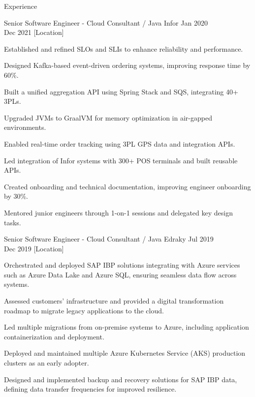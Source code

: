 \documentclass{resume} %
\begin{document}
\begin{rSection}{Experience}
    \begin{rSubsection}
        {Senior Software Engineer - Cloud Consultant / Java}
        {Infor}
        {Jan 2020 \\ Dec 2021}
        [Location]
        \begin{rItemize}
            \item Established and refined SLOs and SLIs to enhance reliability and performance.
            \item Designed Kafka-based event-driven ordering systems, improving response time by 60\%.
            \item Built a unified aggregation API using Spring Stack and SQS, integrating 40+ 3PLs.
            \item Upgraded JVMs to GraalVM for memory optimization in air-gapped environments.
            \item Enabled real-time order tracking using 3PL GPS data and integration APIs.
            \item Led integration of Infor systems with 300+ POS terminals and built reusable APIs.
            \item Created onboarding and technical documentation, improving engineer onboarding by 30\%.
            \item Mentored junior engineers through 1-on-1 sessions and delegated key design tasks.
        \end{rItemize}
    \end{rSubsection}

    \begin{rSubsection}
        {Senior Software Engineer - Cloud Consultant / Java}
        {Edraky}
        {Jul 2019 \\ Dec 2019}
        [Location]
        \begin{rItemize}
            \item Orchestrated and deployed SAP IBP solutions integrating with Azure services such as Azure Data Lake and Azure SQL, ensuring seamless data flow across systems.
            \item Assessed customers' infrastructure and provided a digital transformation roadmap to migrate legacy applications to the cloud.
            \item Led multiple migrations from on-premise systems to Azure, including application containerization and deployment.
            \item Deployed and maintained multiple Azure Kubernetes Service (AKS) production clusters as an early adopter.
            \item Designed and implemented backup and recovery solutions for SAP IBP data, defining data transfer frequencies for improved resilience.
        \end{rItemize}
    \end{rSubsection}


\end{rSection}
\end{document}
